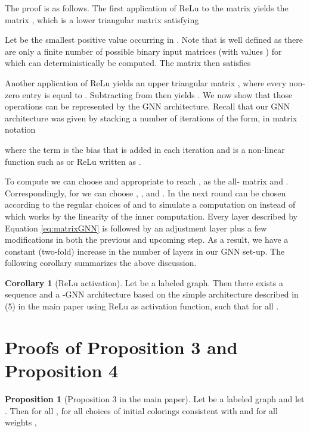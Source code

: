 \documentclass[letterpaper]{article}
\theoremstyle{definition}
\newtheorem{proposition}[theorem]{Proposition}
\newtheorem{corollary}[theorem]{Corollary}
\begin{document}
The proof is as follows. 
The first application of ReLu to the matrix  yields the matrix ,
which is a lower triangular matrix satisfying

Let  be the smallest positive value occurring in .
Note that  is well defined as there are only a finite number of possible binary input matrices (with values ) for which  can deterministically be computed.
The matrix  then satisfies 

Another application of ReLu yields an upper triangular matrix ,
where every non-zero entry is equal to . Subtracting  from  then yields . We now show that those operations can be represented by the GNN architecture.
Recall that our GNN architecture was given by stacking a number of iterations of the form, in matrix notation

where the  term is the bias that is added in each iteration and  is a non-linear function such as  or ReLu written as .

To compute  we can choose  and  appropriate to reach ,  as the all- matrix and .
Correspondingly, for  we can choose , ,  and .
In the next round  can be chosen according to the regular choices of  and  to simulate a computation on  instead of  which works by the linearity of the inner computation. Every layer described by Equation \eqref{eq:matrixGNN} is followed by an adjustment layer plus a few modifications in both the previous and upcoming step.
As a result, we have a constant (two-fold) increase
in the number of layers in our GNN set-up. The following corollary 
summarizes the above discussion.

\begin{corollary}[ReLu activation]
	Let  be a labeled graph.
	Then there exists a sequence  and a -GNN architecture based on the simple architecture described in (5) in the main paper using ReLu as activation function, such that  for all .
\end{corollary}



\section{Proofs of Proposition 3 and Proposition 4}

\begin{proposition}[Proposition 3 in the main paper]
	Let  be a labeled graph and let . Then for all , for all choices of initial colorings  consistent with  and for all weights ,
	
\end{proposition}
\end{document}
